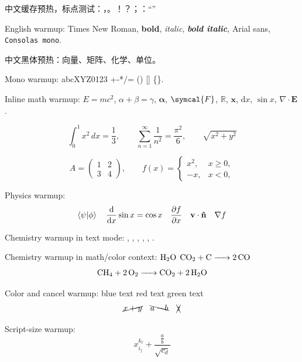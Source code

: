 \documentclass{article}
\begin{document}
\begin{preview}
中文缓存预热，标点测试：，。！？；：“”

English warmup: Times New Roman, \textbf{bold}, \textit{italic},
\textbf{\textit{bold italic}}, \textsf{Arial sans}, \texttt{Consolas mono}.

{\sffamily 中文黑体预热：向量、矩阵、化学、单位。}

{\ttfamily Mono warmup: abcXYZ0123 +-*/= () [] \{\}.}

Inline math warmup:
$E=mc^2$, $\alpha+\beta=\gamma$, $\symbf{\alpha}$, $\symcal{F}$,
$\mathbb{R}$, $\mathbf{x}$, $\mathrm{d}x$, $\sin x$, $\nabla\cdot\mathbf{E}$.

\[
  \int_0^1 x^2\,dx = \frac{1}{3},\qquad
  \sum_{n=1}^{\infty}\frac{1}{n^2}=\frac{\pi^2}{6},\qquad
  \sqrt{x^2+y^2}
\]

\[
  A =
  \begin{pmatrix}
    1 & 2\\
    3 & 4
  \end{pmatrix},
  \qquad
  f(x)=
  \begin{cases}
    x^2, & x \ge 0,\\
    -x,  & x < 0,
  \end{cases}
\]

Physics warmup:
\[
  \ip{\psi}{\phi}\quad
  \dv{x}\sin x=\cos x\quad
  \pdv{f}{x}\quad
  \vb{v}\cdot\vu{n}\quad
  \nabla f
\]

Chemistry warmup in text mode:
, , , , , .

Chemistry warmup in math/color context:
{\color{blue}$\ce{H2O}$}
{\color{red}$\ce{CO2 + C -> 2CO}$}
\[
  \ce{CH4 + 2O2 -> CO2 + 2H2O}
\]

Color and cancel warmup:
{\color{blue}blue text}
{\color{red}red text}
{\color{green!50!black}green text}
\[
  \cancel{x+y}\quad \bcancel{a-b}\quad \xcancel{z}
\]

Script-size warmup:
\[
  x_{i_j}^{k_\ell} + \frac{\frac{a}{b}}{\sqrt{c_d}}
\]

\end{preview}
\end{document}
